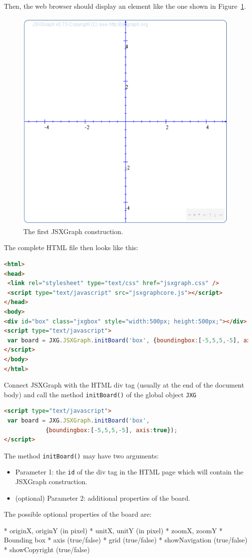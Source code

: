 \documentclass[a4paper]{tufte-book}
\begin{document}
Then, the web browser should display an element like the one shown in Figure~\ref{fig:1}.
\begin{figure}[htb]
\centerline{\includegraphics[width=0.4\linewidth]{images/b2.png}}
\caption{The first JSXGraph construction.}\label{fig:1}
\end{figure}

The complete HTML file then looks like this:
\begin{fullwidth}\begin{lstlisting}[language=HTML]
<html>
<head>
 <link rel="stylesheet" type="text/css" href="jsxgraph.css" />
 <script type="text/javascript" src="jsxgraphcore.js"></script>
</head>
<body>
<div id="box" class="jxgbox" style="width:500px; height:500px;"></div>
<script type="text/javascript">
 var board = JXG.JSXGraph.initBoard('box', {boundingbox:[-5,5,5,-5], axis:true});
</script>
</body>
</html>
\end{lstlisting}\end{fullwidth}
Connect JSXGraph with the HTML div tag (usually at the end of the document body) and call 
the method \lstinline|initBoard()| of the global object \lstinline|JXG|

\begin{lstlisting}[language=HTML]
<script type="text/javascript">
 var board = JXG.JSXGraph.initBoard('box', 
            {boundingbox:[-5,5,5,-5], axis:true});
</script>
\end{lstlisting}
The method \lstinline|initBoard()| may have two arguments:
\begin{itemize}
    \item Parameter 1: the \lstinline|id| of the div tag in the HTML page which will contain the JSXGraph construction.
    \item (optional) Parameter 2: additional properties of the board. 
\end{itemize}
The possible optional properties of the board are:

    * originX, originY (in pixel)
    * unitX, unitY (in pixel)
    * zoomX, zoomY
    * Bounding box
    * axis (true/false)
    * grid (true/false)
    * showNavigation (true/false)
    * showCopyright (true/false) 
\end{document}
